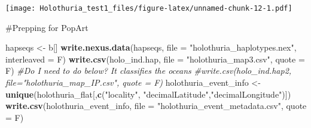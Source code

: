 \documentclass[
]{article}
\newenvironment{Shaded}{\begin{snugshade}}{\end{snugshade}}
\newcommand{\CommentTok}[1]{\textcolor[rgb]{0.56,0.35,0.01}{\textit{#1}}}
\newcommand{\DataTypeTok}[1]{\textcolor[rgb]{0.13,0.29,0.53}{#1}}
\newcommand{\DecValTok}[1]{\textcolor[rgb]{0.00,0.00,0.81}{#1}}
\newcommand{\FloatTok}[1]{\textcolor[rgb]{0.00,0.00,0.81}{#1}}
\newcommand{\KeywordTok}[1]{\textcolor[rgb]{0.13,0.29,0.53}{\textbf{#1}}}
\newcommand{\NormalTok}[1]{#1}
\newcommand{\OperatorTok}[1]{\textcolor[rgb]{0.81,0.36,0.00}{\textbf{#1}}}
\newcommand{\StringTok}[1]{\textcolor[rgb]{0.31,0.60,0.02}{#1}}
\begin{document}
\begin{Shaded}
\end{Shaded}

\texttt{[image: Holothuria\_test1\_files/figure-latex/unnamed-chunk-12-1.pdf]}

\#Prepping for PopArt

\begin{Shaded}
\begin{Highlighting}[]
\NormalTok{hapseqs <-}\StringTok{ }\NormalTok{b[]}
\KeywordTok{write.nexus.data}\NormalTok{(hapseqs, }\DataTypeTok{file =} \StringTok{"holothuria_haplotypes.nex"}\NormalTok{, }\DataTypeTok{interleaved =}\NormalTok{ F)}
\KeywordTok{write.csv}\NormalTok{(holo_ind.hap, }\DataTypeTok{file =} \StringTok{"holothuria_map3.csv"}\NormalTok{, }\DataTypeTok{quote =}\NormalTok{ F)}
\CommentTok{#Do I need to do below? It classifies the oceans}
\CommentTok{#write.csv(holo_ind.hap2, file="holothuria_map_IP.csv", quote = F)}
\NormalTok{holothuria_event_info <-}\StringTok{ }\KeywordTok{unique}\NormalTok{(holothuria_flat[,}\KeywordTok{c}\NormalTok{(}\StringTok{"locality"}\NormalTok{,}
                                                   \StringTok{"decimalLatitude"}\NormalTok{,}\StringTok{"decimalLongitude"}\NormalTok{)])}
\KeywordTok{write.csv}\NormalTok{(holothuria_event_info, }\DataTypeTok{file =} \StringTok{"holothuria_event_metadata.csv"}\NormalTok{, }\DataTypeTok{quote =}\NormalTok{ F)}
\end{Highlighting}
\end{Shaded}
\end{document}
